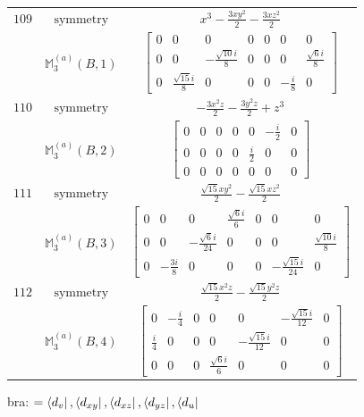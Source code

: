 \documentclass[fleqn,8pt,landscape]{jsarticle}
\begin{document}
\begin{longtable}{ccc}
$ 109 $ & $ \text{symmetry} $ & $ x^{3} - \frac{3 x y^{2}}{2} - \frac{3 x z^{2}}{2} $ \\
$  $ & $ \mathbb{M}_{3}^{(a)}(B,1) $ & $ \begin{bmatrix} 0 & 0 & 0 & 0 & 0 & 0 & 0 \\ 0 & 0 & - \frac{\sqrt{10} i}{8} & 0 & 0 & 0 & \frac{\sqrt{6} i}{8} \\ 0 & \frac{\sqrt{15} i}{8} & 0 & 0 & 0 & - \frac{i}{8} & 0 \end{bmatrix} $ \\ \hline
$ 110 $ & $ \text{symmetry} $ & $ - \frac{3 x^{2} z}{2} - \frac{3 y^{2} z}{2} + z^{3} $ \\
$  $ & $ \mathbb{M}_{3}^{(a)}(B,2) $ & $ \begin{bmatrix} 0 & 0 & 0 & 0 & 0 & - \frac{i}{2} & 0 \\ 0 & 0 & 0 & 0 & \frac{i}{2} & 0 & 0 \\ 0 & 0 & 0 & 0 & 0 & 0 & 0 \end{bmatrix} $ \\ \hline
$ 111 $ & $ \text{symmetry} $ & $ \frac{\sqrt{15} x y^{2}}{2} - \frac{\sqrt{15} x z^{2}}{2} $ \\
$  $ & $ \mathbb{M}_{3}^{(a)}(B,3) $ & $ \begin{bmatrix} 0 & 0 & 0 & \frac{\sqrt{6} i}{6} & 0 & 0 & 0 \\ 0 & 0 & - \frac{\sqrt{6} i}{24} & 0 & 0 & 0 & \frac{\sqrt{10} i}{8} \\ 0 & - \frac{3 i}{8} & 0 & 0 & 0 & - \frac{\sqrt{15} i}{24} & 0 \end{bmatrix} $ \\ \hline
$ 112 $ & $ \text{symmetry} $ & $ \frac{\sqrt{15} x^{2} z}{2} - \frac{\sqrt{15} y^{2} z}{2} $ \\
$  $ & $ \mathbb{M}_{3}^{(a)}(B,4) $ & $ \begin{bmatrix} 0 & - \frac{i}{4} & 0 & 0 & 0 & - \frac{\sqrt{15} i}{12} & 0 \\ \frac{i}{4} & 0 & 0 & 0 & - \frac{\sqrt{15} i}{12} & 0 & 0 \\ 0 & 0 & 0 & \frac{\sqrt{6} i}{6} & 0 & 0 & 0 \end{bmatrix} $ \\ \hline
\end{longtable}
bra: $=\bra{d_{v}}, \bra{d_{xy}}, \bra{d_{xz}}, \bra{d_{yz}}, \bra{d_{u}}$
\end{document}
